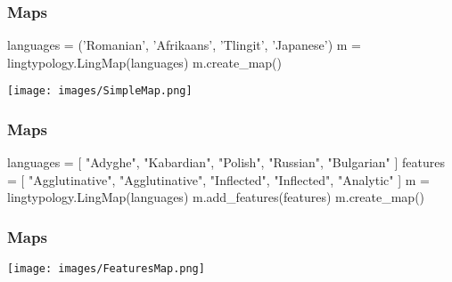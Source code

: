 \documentclass{beamer}
\begin{document}
\begin{frame}[fragile]
\frametitle{Maps}
\begin{python}
languages = ('Romanian', 'Afrikaans', 'Tlingit', 'Japanese')
m = lingtypology.LingMap(languages)
m.create_map()
\end{python}
\texttt{[image: images/SimpleMap.png]}
\end{frame}

\begin{frame}[fragile]
\frametitle{Maps}
\begin{python}
languages = [
    "Adyghe", "Kabardian", "Polish",
    "Russian", "Bulgarian"
]
features = [
    "Agglutinative", "Agglutinative", "Inflected",
    "Inflected", "Analytic"
]
m = lingtypology.LingMap(languages)
m.add_features(features)
m.create_map()
\end{python}
\end{frame}

\begin{frame}
\frametitle{Maps}
\texttt{[image: images/FeaturesMap.png]}
\end{frame}
\end{document}
